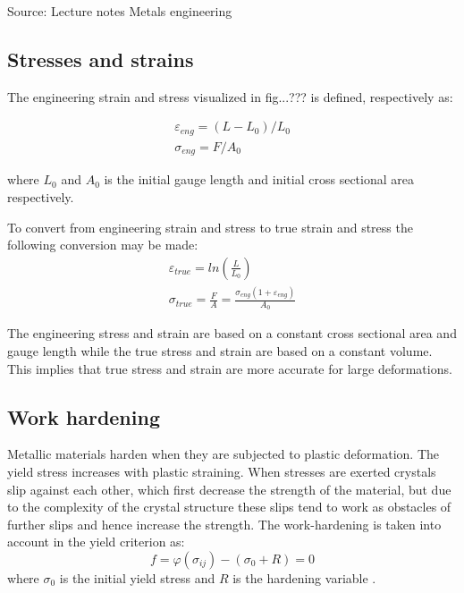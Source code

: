 \documentclass{article}
\begin{document}
Source:
Lecture notes Metals engineering
\subsection{Stresses and strains}
 The engineering strain and stress visualized in fig...??? is defined, respectively as:

 \begin{subequations}
    \begin{alignat}{2}
        \varepsilon_{eng}=(L-L_0)/L_0 \\
        \sigma_{eng}=F/A_0
    \end{alignat}
    \label{Eq:EngStressStrain}
\end{subequations}
 
 where $L_0$ and $A_0$ is the initial gauge length and initial cross sectional area respectively.
 
 To convert from engineering strain and stress to true strain and stress the following conversion may be made:
 \begin{subequations}
    \begin{alignat}{2}
        \varepsilon_{true}=ln(\frac{L}{L_0}) \\
        \sigma_{true}=\frac{F}{A}=\frac{\sigma_{eng}(1+\varepsilon_{eng})}{A_0}
    \end{alignat}
    \label{Eq:TrueStressStrain}
\end{subequations}

 The engineering stress and strain are based on a constant cross sectional area and gauge length while the true stress and strain are based on a constant volume. This implies that true stress and strain are more accurate for large deformations. 
 
\subsection{Work hardening}
Metallic materials harden when they are subjected to plastic deformation. The yield stress increases with plastic straining. When stresses are exerted crystals slip against each other, which first decrease the strength of the material, but due to the complexity of the crystal structure these slips tend to work as obstacles of further slips and hence increase the strength. The work-hardening is taken into account in the yield criterion as:
\begin{equation}
    f=\varphi(\sigma_{ij})-(\sigma_0 + R)=0
\end{equation}
where $\sigma_0$ is the initial yield stress and $R$ is the hardening variable \cite{Hopperstad}.
\end{document}
